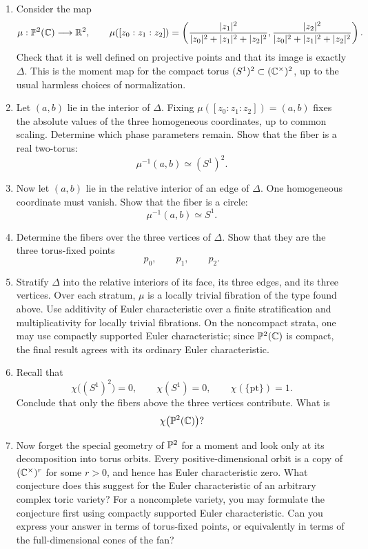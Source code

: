 \begin{enumerate}[label=\textbf{Hint \arabic*.},wide=0pt]

\item Consider the map
\[
\mu:\mathbb{P}^2(\mathbb{C})\longrightarrow\mathbb{R}^2,
\qquad
\mu([z_0:z_1:z_2])
=
\left(
\frac{|z_1|^2}{|z_0|^2+|z_1|^2+|z_2|^2},
\frac{|z_2|^2}{|z_0|^2+|z_1|^2+|z_2|^2}
\right).
\]
Check that it is well defined on projective points and that its image
is exactly \(\Delta\). This is the moment map for the compact torus
\((S^1)^2\subset(\mathbb{C}^\times)^2\), up to the usual harmless choices of
normalization.

\item Let \((a,b)\) lie in the interior of \(\Delta\). Fixing
\(\mu([z_0:z_1:z_2])=(a,b)\) fixes the absolute values of the three
homogeneous coordinates, up to common scaling. Determine which phase
parameters remain. Show that the fiber is a real two-torus:
\[
\mu^{-1}(a,b)\simeq(S^1)^2.
\]

\item Now let \((a,b)\) lie in the relative interior of an edge of
\(\Delta\). One homogeneous coordinate must vanish. Show that the
fiber is a circle:
\[
\mu^{-1}(a,b)\simeq S^1.
\]

\item Determine the fibers over the three vertices of \(\Delta\).
Show that they are the three torus-fixed points
\[
p_0,\qquad p_1,\qquad p_2.
\]

\item Stratify \(\Delta\) into the relative interiors of its face, its
three edges, and its three vertices. Over each stratum, \(\mu\) is a
locally trivial fibration of the type found above. Use additivity of
Euler characteristic over a finite stratification and multiplicativity
for locally trivial fibrations. On the noncompact strata, one may use
compactly supported Euler characteristic; since \(\mathbb{P}^2(\mathbb{C})\) is
compact, the final result agrees with its ordinary Euler
characteristic.

\item Recall that
\[
\chi\bigl((S^1)^2\bigr)=0,
\qquad
\chi(S^1)=0,
\qquad
\chi(\{\mathrm{pt}\})=1.
\]
Conclude that only the fibers above the three vertices contribute.
What is
\[
\chi\bigl(\mathbb{P}^2(\mathbb{C})\bigr)?
\]

\item Now forget the special geometry of \(\mathbb{P}^2\) for a moment and
look only at its decomposition into torus orbits. Every
positive-dimensional orbit is a copy of
\((\mathbb{C}^\times)^r\) for some \(r>0\), and hence has Euler
characteristic zero. What conjecture does this suggest for the Euler
characteristic of an arbitrary complex toric variety? For a
noncomplete variety, you may formulate the conjecture first using
compactly supported Euler characteristic. Can you express your answer
in terms of torus-fixed points, or equivalently in terms of the
full-dimensional cones of the fan?

\end{enumerate}


